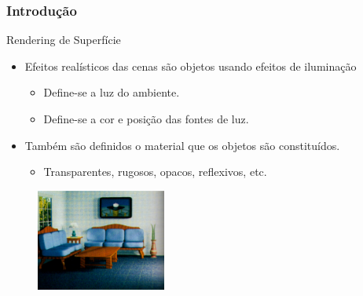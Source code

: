 \documentclass{beamer}
\begin{document}
\begin{frame}
\frametitle{Introdução}


	\begin{block}{Rendering de Superfície}
		\begin{itemize}
			\item Efeitos realísticos das cenas são objetos usando efeitos de iluminação
			\begin{itemize}
				\item Define-se a luz do ambiente.
				\item Define-se a cor e posição das fontes de luz.
			\end{itemize}
			\item Também são definidos o material que os objetos são constituídos.
			\begin{itemize}
				\item Transparentes, rugosos, opacos, reflexivos, etc.
			\end{itemize}
		\end{itemize}
	\end{block}
	
	\begin{figure}[!h]
			\begin{center}
			\includegraphics[width=0.38\textwidth]{Figures/Cen}
			\end{center}
	\end{figure}	
\end{frame}

\end{document}
